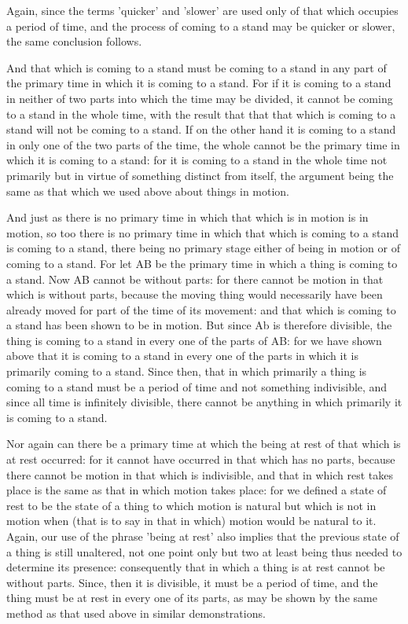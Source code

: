 Again, since the terms 'quicker' and 'slower' are used only of that
which occupies a period of time, and the process of coming to a stand
may be quicker or slower, the same conclusion follows. 

And that which is coming to a stand must be coming to a stand in any
part of the primary time in which it is coming to a stand. For if
it is coming to a stand in neither of two parts into which the time
may be divided, it cannot be coming to a stand in the whole time,
with the result that that that which is coming to a stand will not
be coming to a stand. If on the other hand it is coming to a stand
in only one of the two parts of the time, the whole cannot be the
primary time in which it is coming to a stand: for it is coming to
a stand in the whole time not primarily but in virtue of something
distinct from itself, the argument being the same as that which we
used above about things in motion. 

And just as there is no primary time in which that which is in motion
is in motion, so too there is no primary time in which that which
is coming to a stand is coming to a stand, there being no primary
stage either of being in motion or of coming to a stand. For let AB
be the primary time in which a thing is coming to a stand. Now AB
cannot be without parts: for there cannot be motion in that which
is without parts, because the moving thing would necessarily have
been already moved for part of the time of its movement: and that
which is coming to a stand has been shown to be in motion. But since
Ab is therefore divisible, the thing is coming to a stand in every
one of the parts of AB: for we have shown above that it is coming
to a stand in every one of the parts in which it is primarily coming
to a stand. Since then, that in which primarily a thing is coming
to a stand must be a period of time and not something indivisible,
and since all time is infinitely divisible, there cannot be anything
in which primarily it is coming to a stand. 

Nor again can there be a primary time at which the being at rest of
that which is at rest occurred: for it cannot have occurred in that
which has no parts, because there cannot be motion in that which is
indivisible, and that in which rest takes place is the same as that
in which motion takes place: for we defined a state of rest to be
the state of a thing to which motion is natural but which is not in
motion when (that is to say in that in which) motion would be natural
to it. Again, our use of the phrase 'being at rest' also implies that
the previous state of a thing is still unaltered, not one point only
but two at least being thus needed to determine its presence: consequently
that in which a thing is at rest cannot be without parts. Since, then
it is divisible, it must be a period of time, and the thing must be
at rest in every one of its parts, as may be shown by the same method
as that used above in similar demonstrations. 

